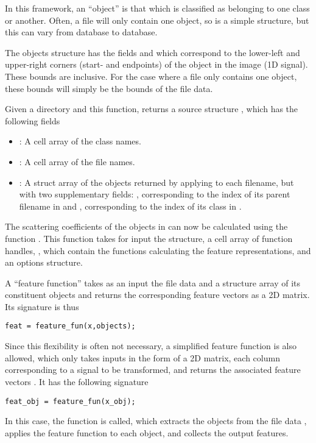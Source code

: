 \documentclass[twocolumn]{article}
\begin{document}
In this framework, an ``object'' is that which is classified as belonging to one class or another. Often, a file will only contain one object, so  is a simple structure, but this can vary from database to database.

The objects structure has the fields  and  which correspond to the lower-left and upper-right corners (start- and endpoints) of the object in the image (1D signal). These bounds are inclusive. For the case where a file only contains one object, these bounds will simply be the bounds of the file data.

Given a directory and this function,  returns a source structure , which has the following fields
\begin{itemize}
	\item {}: A cell array of the class names.
	\item {}: A cell array of the file names.
	\item {}: A struct array of the objects returned by applying  to each filename, but with two supplementary fields: , corresponding to the index of its parent filename in  and , corresponding to the index of its class in .
\end{itemize}

The scattering coefficients of the objects in  can now be calculated using the function . This function takes for input the  structure, a cell array of function handles, , which contain the functions calculating the feature representations, and an options structure.

A ``feature function'' takes as an input the file data and a structure array of its constituent objects and returns the corresponding feature vectors as a 2D matrix. Its signature is thus
\begin{lstlisting}
feat = feature_fun(x,objects);
\end{lstlisting}
Since this flexibility is often not necessary, a simplified feature function is also allowed, which only takes inputs  in the form of a 2D matrix, each column corresponding to a signal to be transformed, and returns the associated feature vectors . It has the following signature
\begin{lstlisting}
feat_obj = feature_fun(x_obj);
\end{lstlisting}
In this case, the function  is called, which extracts the objects from the file data , applies the feature function to each object, and collects the output features.
\end{document}
